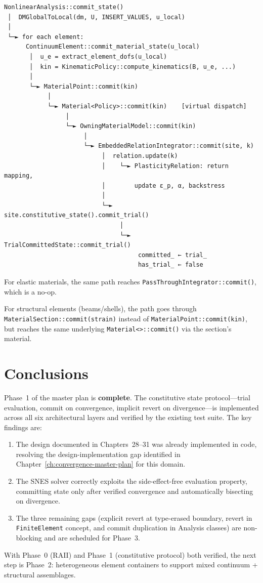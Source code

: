 \begin{verbatim}
NonlinearAnalysis::commit_state()
 │  DMGlobalToLocal(dm, U, INSERT_VALUES, u_local)
 │
 └─► for each element:
      ContinuumElement::commit_material_state(u_local)
       │  u_e = extract_element_dofs(u_local)
       │  kin = KinematicPolicy::compute_kinematics(B, u_e, ...)
       │
       └─► MaterialPoint::commit(kin)
            │
            └─► Material<Policy>::commit(kin)    [virtual dispatch]
                 │
                 └─► OwningMaterialModel::commit(kin)
                      │
                      └─► EmbeddedRelationIntegrator::commit(site, k)
                           │  relation.update(k)
                           │    └─► PlasticityRelation: return mapping,
                           │        update ε_p, α, backstress
                           │
                           └─► site.constitutive_state().commit_trial()
                                │
                                └─► TrialCommittedState::commit_trial()
                                     committed_ ← trial_
                                     has_trial_ ← false
\end{verbatim}

For elastic materials, the same path reaches
\texttt{PassThroughIntegrator::commit()}, which is a no-op.

For structural elements (beams/shells), the path goes through
\texttt{MaterialSection::commit(strain)} instead of
\texttt{MaterialPoint::commit(kin)}, but reaches the same
underlying \texttt{Material<>::commit()} via the section's material.

\section{Conclusions}
\label{sec:phase1-conclusions}

Phase~1 of the master plan is \textbf{complete}.  The constitutive
state protocol---trial evaluation, commit on convergence, implicit
revert on divergence---is implemented across all six architectural
layers and verified by the existing test suite.  The key findings are:

\begin{enumerate}
  \item The design documented in Chapters~28--31 was already implemented
        in code, resolving the design-implementation gap identified in
        Chapter~\ref{ch:convergence-master-plan} for this domain.
  \item The SNES solver correctly exploits the side-effect-free
        evaluation property, committing state only after verified
        convergence and automatically bisecting on divergence.
  \item The three remaining gaps (explicit revert at type-erased
        boundary, revert in \texttt{FiniteElement} concept, and
        commit duplication in Analysis classes) are non-blocking
        and are scheduled for Phase~3.
\end{enumerate}

With Phase~0 (RAII) and Phase~1 (constitutive protocol) both
verified, the next step is Phase~2: heterogeneous element containers
to support mixed continuum + structural assemblages.
